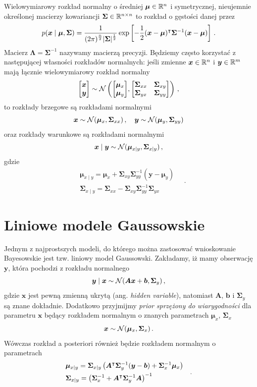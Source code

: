 \documentclass{myclass}
\begin{document}
Wielowymiarowy rozkład normalny o średniej \(\bm{\mu} \in \mathbb{R}^n\) i symetrycznej, nieujemnie
określonej macierzy kowariancji \(\bm{\Sigma} \in \mathbb{R}^{n \times n}\) to rozkład o gęstości danej
przez
\[
    p(\bm{x} \mid \bm{\mu}, \bm{\Sigma}) = \frac{1}{\displaystyle (2\pi)^\frac{n}{2} |\bm{\Sigma}|^\frac{1}{2}} \exp \left[-\frac{1}{2} (\bm{x} - \bm{\mu})^\intercal \bm{\Sigma}^{-1} (\bm{x} - \bm{\mu})\right]\,.
\]
Macierz \(\bm{\Lambda} = \bm{\Sigma}^{-1}\) nazywamy macierzą precyzji. Będziemy często korzystać z
następującej własności rozkładów normalnych: jeśli zmienne \(\bm{x} \in \mathbb{R}^n\) i \(\bm{y} \in
\mathbb{R}^m\) mają łącznie wielowymiarowy rozkład normalny
\[
    \mqty[\bm{x} \\ \bm{y}] \sim \mc{N}\left(\mqty[\bm{\mu}_x \\ \bm{\mu}_y], \mqty[\bm{\Sigma}_{xx} & \bm{\Sigma}_{xy} \\ \bm{\Sigma}_{yx} & \bm{\Sigma}_{yy}]\right)\,,
\]
to rozkłady brzegowe są rozkładami normalnymi
\[
    \bm{x} \sim \mathcal{N}(\bm{\mu}_x, \bm{\Sigma}_{xx})\,,\quad \bm{y} \sim \mathcal{N}(\bm{\mu}_y, \bm{\Sigma}_{yy})
\]
oraz rozkłady warunkowe są rozkładami normalnymi
\[
    \bm{x} \mid \bm{y} \sim \mathcal{N}(\bm{\mu}_{x\mid y}, \bm{\Sigma}_{x \mid y})\,,
\]
gdzie
\[
\begin{split}
    &\bm{\mu}_{x \mid y} = \bm{\mu}_x + \bm{\Sigma}_{xy} \bm{\Sigma}_{yy}^{-1} (\bm{y} - \bm{\mu}_y) \\
    &\bm{\Sigma}_{x \mid y} = \bm{\Sigma}_{xx} - \bm{\Sigma}_{xy} \bm{\Sigma}_{yy}^{-1} \bm{\Sigma}_{yx}
\end{split}\quad.
\]

\section{Liniowe modele Gaussowskie}

Jednym z najprostszych modeli, do którego można zastosować wnioskowanie Bayesowskie jest tzw.
liniowy model Gaussowski. Zakładamy, iż mamy obserwację \(\bm{y}\), która pochodzi z rozkładu
normalnego
\[
    \bm{y} \mid \bm{x} \sim \mathcal{N}(\bm{A}\bm{x} + \bm{b}, \bm{\Sigma}_y)\,,
\]
gdzie \(\bm{x}\) jest pewną zmienną ukrytą (ang. \emph{hidden variable}), natomiast \(\bm{A}\),
\(\bm{b}\) i \(\bm{\Sigma}_y\) są znane dokładnie. Dodatkowo przyjmijmy \emph{prior sprzężony do
wiarygodności} dla parametru \(\bm{x}\) będący rozkładem normalnym o znanych parametrach
\(\bm{\mu}_x\), \(\bm{\Sigma}_x\)
\[
    \bm{x} \sim \mathcal{N}(\bm{\mu}_x, \bm{\Sigma}_x) \,.
\]
Wówczas rozkład a posteriori również będzie rozkładem normalnym o parametrach
\[
\begin{split}
    &\bm{\mu}_{x \mid y} = \bm{\Sigma}_{x \mid y} \left( \bm{A}^\intercal \bm{\Sigma}_y^{-1}(\bm{y} - \bm{b}) + \bm{\Sigma}_x^{-1} \bm{\mu}_x \right)\\
    &\bm{\Sigma}_{x \mid y} = \left(\bm{\Sigma}_x^{-1} + \bm{A}^\intercal \bm{\Sigma}_y^{-1} \bm{A} \right)^{-1}
\end{split}\quad.
\]
\end{document}
